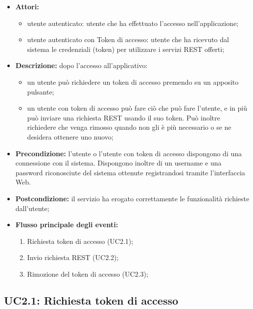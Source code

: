 \begin{itemize}
	\item \textbf{Attori:}
	\begin{itemize}
		\item utente autenticato: utente che ha effettuato l'accesso nell'applicazione;
		\item utente autenticato con Token di accesso: utente che ha ricevuto dal sistema le credenziali (token) per utilizzare i servizi REST offerti;
	\end{itemize}
	\item \textbf{Descrizione:} dopo l'accesso all'applicativo:
	\begin{itemize}
		\item un utente può richiedere un token di accesso premendo su un apposito pulsante;
		\item un utente con token di accesso può fare ciò che può fare l'utente, e in più può inviare una richiesta REST usando il suo token. Può inoltre richiedere che venga rimosso quando non gli è più necessario o se ne desidera ottenere uno nuovo;
	\end{itemize}
	\item \textbf{Precondizione:} l'utente o l'utente con token di accesso dispongono di una connessione con il sistema. Dispongono inoltre di un username e una password riconosciute del sistema ottenute registrandosi tramite l'interfaccia Web.
	\item \textbf{Postcondizione:} il servizio ha erogato correttamente le funzionalità richieste dall'utente;
	\item \textbf{Flusso principale degli eventi:}
	\begin{enumerate}
		\item Richiesta token di accesso (UC2.1);
		\item Invio richiesta REST (UC2.2);
		\item Rimozione del token di accesso (UC2.3);
	\end{enumerate}
\end{itemize}

\pagebreak

\subsection{UC2.1: Richiesta token di accesso}

